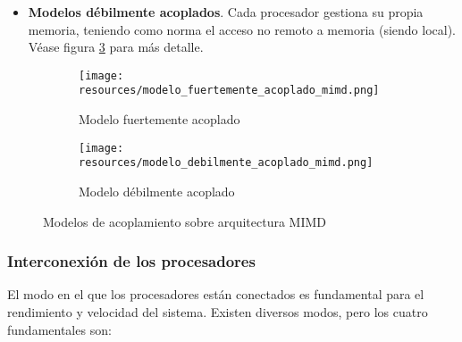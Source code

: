 \documentclass[a4paper, 11pt, titlepage]{article}
\begin{document}
\begin{itemize}
\begin{itemize}
                \begin{itemize}
                    \item \textbf{UMA} o acceso uniforme a memoria.
                    \item \textbf{NUMA} o acceso no uniforme a memoria, donde  la  velocidad  de acceso a 
                    distintas zonas de memoria puede ser distinta.
                \end{itemize}

                Véase figura \ref{modelo_fuertemente_acoplado} para más detalle.
        
                \item \textbf{Modelos   débilmente   acoplados}. Cada procesador gestiona su propia 
                memoria, teniendo como norma el acceso no remoto a memoria (siendo local). Véase figura 
                \ref{modelo_debilmente_acoplado} para más detalle.
            \end{itemize}

            \begin{figure}[!tbp]
                \begin{subfigure}[b]{0.5\textwidth}
                  \texttt{[image: resources/modelo\_fuertemente\_acoplado\_mimd.png]}
                  \caption{Modelo fuertemente acoplado}
                  \label{modelo_fuertemente_acoplado}
                \end{subfigure}
                \hfill
                \begin{subfigure}[b]{0.5\textwidth}
                  \texttt{[image: resources/modelo\_debilmente\_acoplado\_mimd.png]}
                  \caption{Modelo débilmente acoplado}
                  \label{modelo_debilmente_acoplado}
                \end{subfigure}
                \caption{Modelos de acoplamiento sobre arquitectura MIMD}
              \end{figure}
        \end{itemize}

        \subsubsection{Interconexión de los procesadores}

            El modo en el que los procesadores están conectados es fundamental para el rendimiento
            y velocidad del sistema. Existen diversos modos, pero los cuatro fundamentales son:
\end{document}
